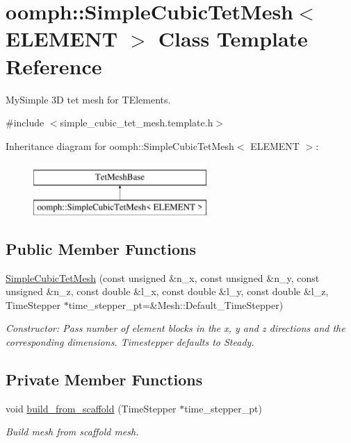 \hypertarget{classoomph_1_1SimpleCubicTetMesh}{}\section{oomph\+:\+:Simple\+Cubic\+Tet\+Mesh$<$ E\+L\+E\+M\+E\+NT $>$ Class Template Reference}
\label{classoomph_1_1SimpleCubicTetMesh}


My\+Simple 3D tet mesh for T\+Elements.  




{\ttfamily \#include $<$simple\+\_\+cubic\+\_\+tet\+\_\+mesh.\+template.\+h$>$}

Inheritance diagram for oomph\+:\+:Simple\+Cubic\+Tet\+Mesh$<$ E\+L\+E\+M\+E\+NT $>$\+:\begin{figure}[H]
\begin{center}
\leavevmode
\includegraphics[height=2.000000cm]{classoomph_1_1SimpleCubicTetMesh}
\end{center}
\end{figure}
\subsection*{Public Member Functions}
\begin{DoxyCompactItemize}
\item 
\hyperlink{classoomph_1_1SimpleCubicTetMesh_a636c5d124ede05ff29abdcf7fdd08391}{Simple\+Cubic\+Tet\+Mesh} (const unsigned \&n\+\_\+x, const unsigned \&n\+\_\+y, const unsigned \&n\+\_\+z, const double \&l\+\_\+x, const double \&l\+\_\+y, const double \&l\+\_\+z, Time\+Stepper $\ast$time\+\_\+stepper\+\_\+pt=\&Mesh\+::\+Default\+\_\+\+Time\+Stepper)
\begin{DoxyCompactList}\small\item\em Constructor\+: Pass number of element blocks in the x, y and z directions and the corresponding dimensions. Timestepper defaults to Steady. \end{DoxyCompactList}\end{DoxyCompactItemize}
\subsection*{Private Member Functions}
\begin{DoxyCompactItemize}
\item 
void \hyperlink{classoomph_1_1SimpleCubicTetMesh_a558c1fcc4bd91cdb2830977df2171537}{build\+\_\+from\+\_\+scaffold} (Time\+Stepper $\ast$time\+\_\+stepper\+\_\+pt)
\begin{DoxyCompactList}\small\item\em Build mesh from scaffold mesh. \end{DoxyCompactList}\end{DoxyCompactItemize}
